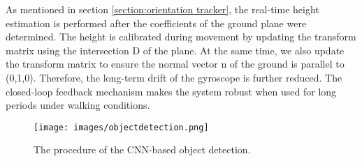 \documentclass{ieeeaccess}
\begin{document}
As mentioned in section \ref{section:orientation tracker}, the real-time height estimation is performed after the coefficients of the ground plane were determined. The height is calibrated during movement by updating the transform matrix using the intersection D of the plane. At the same time, we also update the transform matrix to ensure the normal vector n of the ground is parallel to (0,1,0). Therefore, the long-term drift of the gyroscope is further reduced. The closed-loop feedback mechanism makes the system robust when used for long periods under walking conditions.
\begin{figure}[b]
    \centering
    \texttt{[image: images/objectdetection.png]}
    \caption{The procedure of the CNN-based object detection.}
    \label{fig:objectdetection_procedure}
\end{figure}
\end{document}
